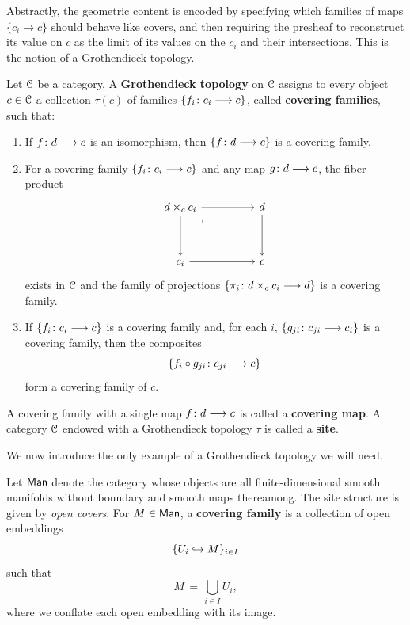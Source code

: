 \medskip

Abstractly, the geometric content is encoded by specifying which families of
maps $\{c_i\to c\}$ should behave like covers, and then requiring the
presheaf to reconstruct its value on $c$ as the limit of its values on the
$c_i$ and their intersections. This is the notion of a Grothendieck topology.

\begin{definition}\label{ch3:: def: site}
   Let $\mathcal C$ be a category. A \textbf{Grothendieck topology} on $\mathcal C$ assigns
   to every object $c\in \mathcal C$ a collection $\tau(c)$ of families
   $\{f_i\colon c_i \longrightarrow c\}$, called \textbf{covering families}, such that:
   \begin{enumerate}
     \item If $f\colon d \longrightarrow c$ is an isomorphism, then
     $\{f\colon d \longrightarrow c\}$ is a covering family.
     \item For a covering family $\{f_i \colon c_i \longrightarrow c\}$ and any map
     $g\colon d \longrightarrow c$, the fiber product
     \[
        \begin{tikzcd}[ampersand replacement=\&]
            {d \times_{c}c_i} \&\& d \\
            \\
            {c_i} \&\& c
            \arrow[from=1-1, to=1-3]
            \arrow[from=1-1, to=3-1]
            \arrow["\lrcorner"{anchor=center, pos=0.125}, draw=none, from=1-1, to=3-3]
            \arrow[from=1-3, to=3-3]
            \arrow[from=3-1, to=3-3]
        \end{tikzcd}
     \]
     exists in $\mathcal C$ and the family of projections
     $\{\pi_i \colon d\times_c c_{i} \longrightarrow d\}$ is a covering family.
     \item If $\{f_i \colon c_i \longrightarrow c\}$ is a covering family and, for each
     $i$, $\{g_{ji}\colon c_{ji} \longrightarrow c_{i}\}$ is a covering family, then
     the composites
     \[
        \{f_i \circ g_{ji}\colon c_{ji} \longrightarrow c\}
     \]
     form a covering family of $c$.
   \end{enumerate}
   A covering family with a single map $f\colon d \longrightarrow c$ is called a
   \textbf{covering map}. A category $\mathcal C$ endowed with a Grothendieck
   topology $\tau$ is called a \textbf{site}.
\end{definition}

We now introduce the only example of a Grothendieck topology we will need.

\begin{definition}\label{ch3:: def: smooth site}
    Let $\operatorname{\sf Man}$ denote the category whose objects are all finite-dimensional
    smooth manifolds without boundary and smooth maps thereamong. The site
    structure is given by \emph{open covers}. For $M\in\operatorname{\sf Man}$, a
    \textbf{covering family} is a collection of open embeddings
    \[
      \{U_i \hookrightarrow M\}_{i\in I}
    \]
    such that
    \[
      M \,=\, \bigcup_{i \in I} U_i,
    \]
    where we conflate each open embedding with its image.
\end{definition}

